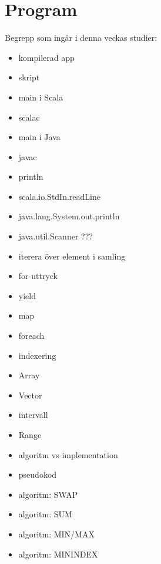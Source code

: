 \chapter{Program}\label{chapter:W02}
Begrepp som ingår i denna veckas studier:
\begin{itemize}[noitemsep,label={$\square$},leftmargin=*]
\item kompilerad app
\item skript
\item main i Scala
\item scalac
\item main i Java
\item javac
\item println
\item scala.io.StdIn.readLine
\item java.lang.System.out.println
\item java.util.Scanner ???
\item iterera över element i samling
\item for-uttryck
\item yield
\item map
\item foreach
\item indexering
\item Array
\item Vector
\item intervall
\item Range
\item algoritm vs implementation
\item pseudokod
\item algoritm: SWAP
\item algoritm: SUM
\item algoritm: MIN/MAX
\item algoritm: MININDEX\end{itemize}
